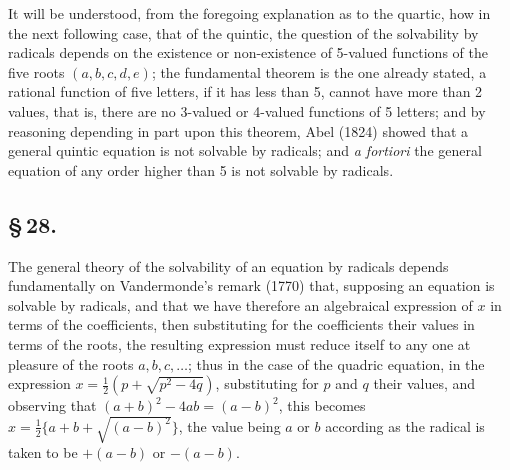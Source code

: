 \documentclass[11pt,a4paper]{article}
\begin{document}
It will be understood, from the foregoing explanation as to the quartic, how in the next following case, that of the quintic, the question of the solvability by radicals depends on the existence or non-existence of 5-valued functions of the five roots $(a, b, c, d, e)$; the fundamental theorem is the one already stated, a rational function of five letters, if it has less than 5, cannot have more than 2 values, that is, there are no 3-valued or 4-valued functions of 5 letters; and by reasoning depending in part upon this theorem, Abel (1824) showed that a general quintic equation is not solvable by radicals; and \textit{a fortiori} the general equation of any order higher than 5 is not solvable by radicals.

\subsection*{\S\,28.}

The general theory of the solvability of an equation by radicals depends fundamentally on Vandermonde's remark (1770) that, supposing an equation is solvable by radicals, and that we have therefore an algebraical expression of $x$ in terms of the coefficients, then substituting for the coefficients their values in terms of the roots, the resulting expression must reduce itself to any one at pleasure of the roots $a, b, c, \ldots$; thus in the case of the quadric equation, in the expression $x = \frac{1}{2}(p + \sqrt{p^{2} - 4q})$, substituting for $p$ and $q$ their values, and observing that $(a + b)^{2} - 4ab = (a - b)^{2}$, this becomes $x = \frac{1}{2}\{a + b + \sqrt{(a - b)^{2}}\}$, the value being $a$ or $b$ according as the radical is taken to be $+(a - b)$ or $-(a - b)$.
\end{document}
